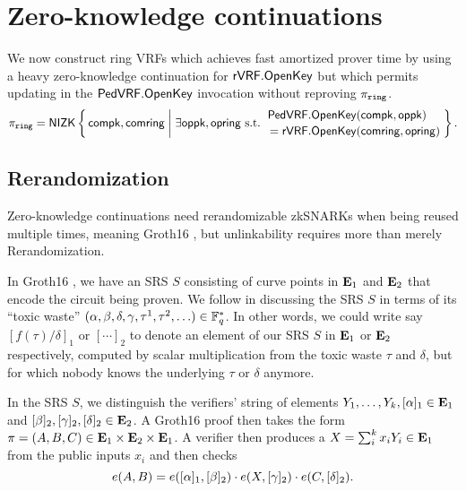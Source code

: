 
\section{Zero-knowledge continuations}
\label{sec:rvrf_cont}

\newcommand\rrSNARK{\primalgo{Groth16}\xspace}
\newcommand\pifast{\ensuremath{\pi_{\mathtt{fast}}}\xspace}
\newcommand\pifastdot{\ensuremath{\dot{\pi}_{\mathtt{fast}}}\xspace}
\newcommand\pisafe{\ensuremath{\pi_{\mathtt{safe}}}\xspace}
\newcommand\pisafedot{\ensuremath{\dot{\pi}_{\mathtt{safe}}}\xspace}

We now construct ring VRFs which achieves fast amortized prover time
by using a heavy zero-knowledge continuation for ${\mathsf{rVRF}}.{\mathsf{OpenKey}}$ but
which permits updating \openpk in the ${\mathsf{PedVRF}}.{\mathsf{OpenKey}}$ invocation
without reproving $\pi_{\mathtt{ring}}$.
$$ \piring = \NIZK \Setst{ \compk, \comring }{
 \exists \openpk,\openring \textrm{\ s.t.\ } 
 \genfrac{}{}{0pt}{}{\PedVRF.\OpenKey(\compk,\openpk) \quad}{\,\, = \rVRF.\OpenKey(\comring,\openring)}
} \mathperiod $$

\subsection{Rerandomization}

Zero-knowledge continuations need rerandomizable zkSNARKs
when being reused multiple times, meaning Groth16 \cite{groth16},
but unlinkability requires more than merely Rerandomization.

In Groth16 \cite{groth16}, we have an SRS $S$ consisting of curve
points in ${\mathbf{E}}_1$ and ${\mathbf{E}}_2$ that encode the circuit being proven.
We follow \cite{groth16} in discussing the SRS $S$ in terms of
its ``toxic waste''
 $(\alpha,\beta,\delta,\gamma,\tau^1,\tau^2,\ldots) \in \mathbb{F}_q^*$.
In other words, we could write say $[ f(\tau)/\delta ]_1$ or $[\cdots]_2$
to denote an element of our SRS $S$ in ${\mathbf{E}}_1$ or ${\mathbf{E}}_2$ respectively,
computed by scalar multiplication from the toxic waste $\tau$ and $\delta$,
 but for which nobody knows the underlying $\tau$ or $\delta$ anymore.

In the SRS $S$, we distinguish the verifiers' string of elements
 $Y_1,\ldots,Y_k, [\alpha]_1 \in {\mathbf{E}}_1$ and
 $[\beta]_2, [\gamma]_2, [\delta]_2 \in {\mathbf{E}}_2$.
A Groth16 \cite{groth16} proof then takes the form 
 $\pi = (A,B,C) \in {\mathbf{E}}_1 \times {\mathbf{E}}_2 \times {\mathbf{E}}_1$.
A verifier then produces a $X = \sum_i^k x_i Y_i \in {\mathbf{E}}_1$ from
 the public inputs $x_i$ and then checks 
$$ e(A,B) = e([\alpha]_1, [\beta]_2) \cdot
 e(X, [\gamma]_2) \cdot e(C, [\delta]_2) . $$

